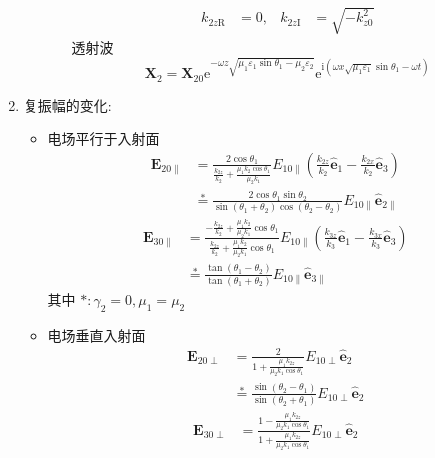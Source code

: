 \documentclass[12pt,a4paper]{article}%
\numberwithin{equation}{section}%
\renewcommand*{\vec}[1]{\bm{#1}}%
\newcommand\mi{\mathrm{i}}
\newcommand\e{\mathrm{e}}%
\newcommand*{\uvec}[1]{\hat{\vec{#1}}}
\begin{document}
\begin{enumerate}
\begin{itemize}
\begin{itemize}
\begin{align}
                 k_{2z\mathrm R} &= 0,& k_{2z\mathrm I} &= \sqrt{-k_{z0}^2}
             \end{align}
             透射波
             \begin{equation}
                 \vec X_2 = \vec X_{20}\e^{-\omega z\sqrt{\mu_1\varepsilon_1\sin\theta_1 - \mu_2\varepsilon_2}}\e^{\mi(\omega x\sqrt{\mu_1\varepsilon_1}\sin\theta_1 - \omega t)}
             \end{equation}
         \end{itemize}
     \end{itemize}
    \item 复振幅的变化:
    \begin{itemize}
        \item 电场平行于入射面 
        \begin{align}
            \vec E_{20\parallel} &= \frac{2\cos\theta_1}{\frac{k_{2z}}{k_2}+\frac{\mu_1k_2\cos\theta_1}{\mu_2k_1}}E_{10\parallel}\left(\frac{k_{2z}}{k_2}\uvec e_1 - \frac{k_{2x}}{k_2}\uvec e_3\right) \\
            &\stackrel{*}{=} \frac{2\cos\theta_1\sin\theta_2}{\sin(\theta_1+\theta_2)\cos(\theta_2-\theta_2)}E_{10\parallel}\uvec e_{2\parallel} \label{equ_frepara2}
         \end{align}
         \begin{align}
            \vec E_{30\parallel} &= \frac{-\frac{k_{2z}}{k_2} + \frac{\mu_1k_2}{\mu_2k_1}\cos\theta_1}{\frac{k_{2z}}{k_2} + \frac{\mu_1k_2}{\mu_2k_1}\cos\theta_1}E_{10\parallel}\left(\frac{k_{3z}}{k_3}\uvec e_1 - \frac{k_{3x}}{k_3}\uvec e_3\right) \\
            &\stackrel{*}{=} \frac{\tan(\theta_1-\theta_2)}{\tan(\theta_1+\theta_2)}E_{10\parallel}\uvec e_{3\parallel} \label{equ_frepara3}
        \end{align}
        其中 $* : \gamma_2 = 0, \mu_1= \mu_2$
        \item 电场垂直入射面
        \begin{align}
            \vec E_{20\perp} &= \frac{2}{1+\frac{\mu_1k_{2z}}{\mu_2k_1\cos\theta_1}}E_{10\perp}\uvec e_2 \\
            &\stackrel{*}{=} \frac{\sin(\theta_2 - \theta_1)}{\sin(\theta_2 + \theta_1)}E_{10\perp}\uvec e_2 \label{equ_freperp2}
         \end{align}
         \begin{align}
            \vec E_{30\perp} &= \frac{1-\frac{\mu_1k_{2z}}{\mu_2k_1\cos\theta_1}}{1+\frac{\mu_1k_{2z}}{\mu_2k_1\cos\theta_1}}E_{10\perp}\uvec e_2 \\

\end{align}
\end{itemize}
\end{enumerate}
\end{document}
